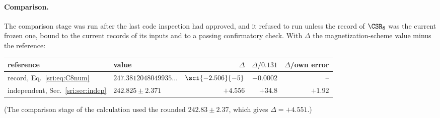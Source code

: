 \paragraph{Comparison.} The comparison stage was run after the last code inspection had approved, and it refused to
run unless the record of $\CSR_8$ was the current frozen one, bound to the current records of its inputs and to a
passing confirmatory check. With $\Delta$ the magnetization-scheme value minus the reference:
\begin{center}\small
\begin{tabular}{@{}llrrr@{}}
\toprule
reference & value & $\Delta$ & $\Delta/0.131$ & $\Delta$/own error\\
\midrule
record, Eq.~\eqref{sri:eq:C8num} & $247.3812048049935\ldots$ & $\sci{-2.506}{-5}$ & $-0.0002$ & --\\
independent, Sec.~\ref{sri:sec:indep} & $242.825\pm2.371$ & $+4.556$ & $+34.8$ & $+1.92$\\
\bottomrule
\end{tabular}
\end{center}
(The comparison stage of the calculation used the rounded $242.83\pm2.37$, which gives $\Delta=+4.551$.)

